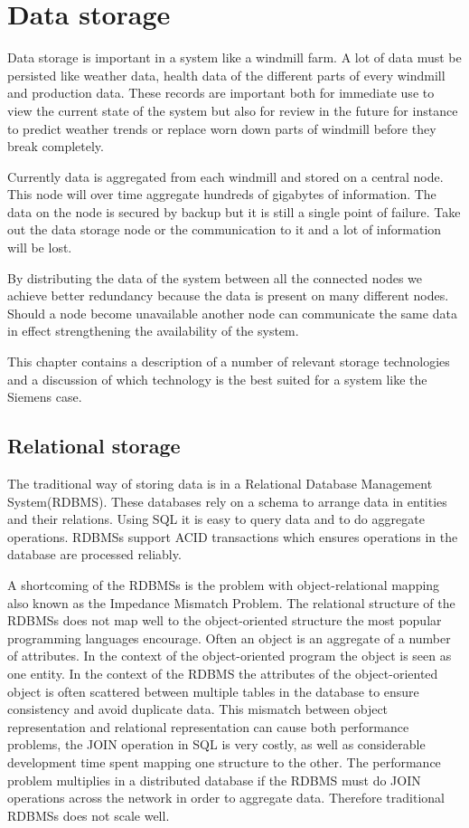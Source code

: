 \chapter{Data storage}
Data storage is important in a system like a windmill farm.
A lot of data must be persisted like weather data, health data of the different parts of every windmill and production data.
These records are important both for immediate use to view the current state of the system but also for review in the future for instance to predict weather trends or replace worn down parts of windmill before they break completely.

Currently data is aggregated from each windmill and stored on a central node.
This node will over time aggregate hundreds of gigabytes of information.
The data on the node is secured by backup but it is still a single point of failure.
Take out the data storage node or the communication to it and a lot of information will be lost.

By distributing the data of the system between all the connected nodes we achieve better redundancy because the data is present on many different nodes.
Should a node become unavailable another node can communicate the same data in effect strengthening the availability of the system.

This chapter contains a description of a number of relevant storage technologies and a discussion of which technology is the best suited for a system like the Siemens case.

\section{Relational storage}
The traditional way of storing data is in a Relational Database Management System(RDBMS).
These databases rely on a schema to arrange data in entities and their relations.
Using SQL it is easy to query data and to do aggregate operations.
RDBMSs support ACID transactions which ensures operations in the database are processed reliably.

A shortcoming of the RDBMSs is the problem with object-relational mapping also known as the Impedance Mismatch Problem\cite{Fowler:IntroNoSQL, Neward:TheVietnamOfComputerScience}.
The relational structure of the RDBMSs does not map well to the object-oriented structure the most popular programming languages encourage.
Often an object is an aggregate of a number of attributes.
In the context of the object-oriented program the object is seen as one entity.
In the context of the RDBMS the attributes of the object-oriented object is often scattered between multiple tables in the database to ensure consistency and avoid duplicate data.
This mismatch between object representation and relational representation can cause both performance problems, the JOIN operation in SQL is very costly, as well as considerable development time spent mapping one structure to the other.
The performance problem multiplies in a distributed database if the RDBMS must do JOIN operations across the network in order to aggregate data.
Therefore traditional RDBMSs does not scale well.

